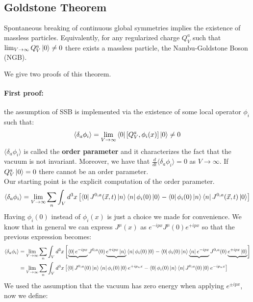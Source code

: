 \documentclass[../main.tex]{subfiles}
\begin{document}
\subsection{Goldstone Theorem}
\label{GT}
\begin{theorem}
Spontaneous breaking of continuous global symmetries implies the existence of massless particles. Equivalently, for any regularized charge $Q_V^a$ such that $\lim_{V\to\infty}Q_V^a\ket{0}\neq0$ there exists a massless particle, the Nambu-Goldstone Boson (NGB). 
\end{theorem}
We give two proofs of this theorem.
\paragraph{First proof:} the assumption of SSB is implemented via the existence of some local operator $\phi_i$ such that:
\[
\langle\delta_a\phi_i\rangle=\lim_{V\to\infty}\bra{0}[Q_V^a,\phi_i(x)]\ket{0}\neq0
\]
$\langle\delta_a\phi_i\rangle$ is called the \textbf{order parameter} and it characterizes the fact that the vacuum is not invariant. Moreover, we have that $\frac{d}{dt}\langle\delta_a\phi_i\rangle=0$ as $V\to\infty$. If $Q_V^a\ket{0}=0$ there cannot be an order parameter.\\
Our starting point is the explicit computation of the order parameter.
\[
\langle\delta_a\phi_i\rangle=\lim_{V\to\infty}\sum_n\int_Vd^3x\left[\bra{0}J^{0,a}(\Vec{x},t)\ket{n}\bra{n}\phi_i(0)\ket{0}-\bra{0}\phi_i(0)\ket{n}\bra{n}J^{0,a}(\Vec{x},t)\ket{0}\right]
\]
Having $\phi_i(0)$ instead of $\phi_i(x)$ is just a choice we made for convenience. We know that in general we can express $J^\mu(x)$ as $e^{-ipx}J^\mu(0)e^{+ipx}$ so that the previous expression becomes:
\begin{align*}
\langle\delta_a\phi_i\rangle&=\lim_{V\to\infty}\sum_n\int_Vd^3x\left[\underbrace{\bra{0}e^{-ipx}}J^{0,a}(0)\underbrace{e^{+ipx}\ket{n}}\bra{n}\phi_i(0)\ket{0}-\bra{0}\phi_i(0)\ket{n}\underbrace{\bra{n}e^{-ipx}}J^{0,a}(0)\underbrace{e^{+ipx}\ket{0}}\right]\\
&=\lim_{V\to\infty}\sum_n\int_Vd^3x\left[\bra{0}J^{0,a}(0)\ket{n}\bra{n}\phi_i(0)\ket{0}e^{+ip_nx}-\bra{0}\phi_i(0)\ket{n}\bra{n}J^{0,a}(0)\ket{0}e^{-ip_nx}\right]
\end{align*}
We used the assumption that the vacuum has zero energy when applying $e^{\pm ipx}$, now we define:
\end{document}
